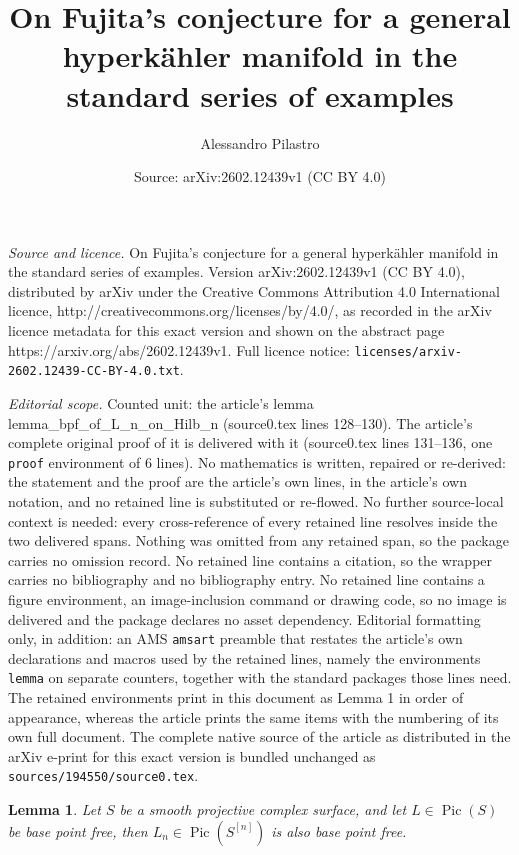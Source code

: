 \documentclass[10pt,a4paper]{amsart}
\title{On Fujita's conjecture for a general hyperk\"ahler manifold in the standard series of examples}
\author{Alessandro Pilastro}
\date{Source: arXiv:2602.12439v1 (CC BY 4.0)}
\newtheorem{lemma}{Lemma}
\DeclareMathOperator{\Pic}{Pic}
\newcommand{\hilb}[2][n]{#2^{[#1]}}
\begin{document}
\maketitle

\noindent\emph{Source and licence.} On Fujita's conjecture for a general hyperk\"ahler manifold in the standard series of examples. Version arXiv:2602.12439v1 (CC BY 4.0), distributed by arXiv under the Creative Commons Attribution 4.0 International licence, http://creativecommons.org/licenses/by/4.0/, as recorded in the arXiv licence metadata for this exact version and shown on the abstract page https://arxiv.org/abs/2602.12439v1. Full licence notice: \texttt{licenses/arxiv-2602.12439-CC-BY-4.0.txt}.\par\smallskip

\noindent\textit{Editorial scope.} Counted unit: the article's lemma lemma\_bpf\_of\_L\_n\_on\_Hilb\_n (source0.tex lines 128--130). The article's complete original proof of it is delivered with it (source0.tex lines 131--136, one \texttt{proof} environment of 6 lines). No mathematics is written, repaired or re-derived: the statement and the proof are the article's own lines, in the article's own notation, and no retained line is substituted or re-flowed.  No further source-local context is needed: every cross-reference of every retained line resolves inside the two delivered spans.  Nothing was omitted from any retained span, so the package carries no omission record.  No retained line contains a citation, so the wrapper carries no bibliography and no bibliography entry.  No retained line contains a figure environment, an image-inclusion command or drawing code, so no image is delivered and the package declares no asset dependency.  Editorial formatting only, in addition: an AMS \texttt{amsart} preamble that restates the article's own declarations and macros used by the retained lines, namely the environments \texttt{lemma} on separate counters, together with the standard packages those lines need.  The retained environments print in this document as Lemma 1 in order of appearance, whereas the article prints the same items with the numbering of its own full document.  The complete native source of the article as distributed in the arXiv e-print for this exact version is bundled unchanged as \texttt{sources/194550/source0.tex}.
\begin{lemma}\label{lemma_bpf_of_L_n_on_Hilb_n}
Let $S$ be a smooth projective complex surface, and let $L\in\Pic(S)$ be base point free, then $L_n\in \Pic(\hilb{S})$ is also base point free.    
\end{lemma}
\end{document}
